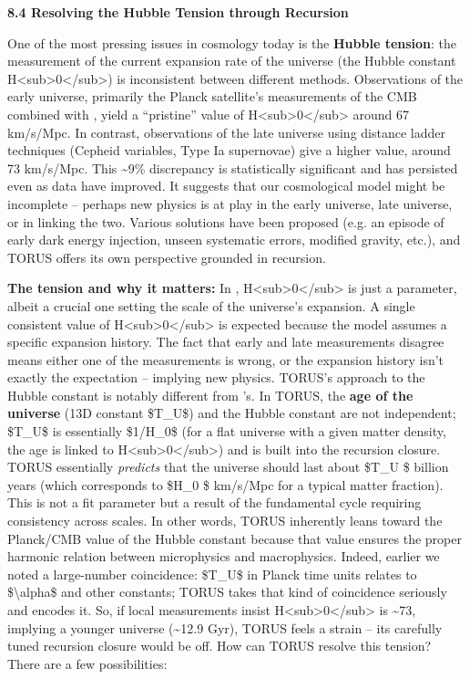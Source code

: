 \documentclass[
]{article}
\begin{document}
\textbf{8.4 Resolving the Hubble Tension through Recursion}

One of the most pressing issues in cosmology today is the \textbf{Hubble
tension}: the measurement of the current expansion rate of the universe
(the Hubble constant
H\textless sub\textgreater0\textless/sub\textgreater) is inconsistent
between different methods. Observations of the early universe, primarily
the Planck satellite's measurements of the CMB combined with \LambdaCDM, yield
a ``pristine'' value of
H\textless sub\textgreater0\textless/sub\textgreater{} around 67
km/s/Mpc. In contrast, observations of the late universe using distance
ladder techniques (Cepheid variables, Type Ia supernovae) give a higher
value, around 73 km/s/Mpc. This \textasciitilde9\% discrepancy is
statistically significant and has persisted even as data have improved.
It suggests that our cosmological model might be incomplete -- perhaps
new physics is at play in the early universe, late universe, or in
linking the two. Various solutions have been proposed (e.g. an episode
of early dark energy injection, unseen systematic errors, modified
gravity, etc.), and TORUS offers its own perspective grounded in
recursion.

\textbf{The tension and why it matters:} In \LambdaCDM,
H\textless sub\textgreater0\textless/sub\textgreater{} is just a
parameter, albeit a crucial one setting the scale of the universe's
expansion. A single consistent value of
H\textless sub\textgreater0\textless/sub\textgreater{} is expected
because the model assumes a specific expansion history. The fact that
early and late measurements disagree means either one of the
measurements is wrong, or the expansion history isn't exactly the \LambdaCDM
expectation -- implying new physics. TORUS's approach to the Hubble
constant is notably different from \LambdaCDM's. In TORUS, the \textbf{age of
the universe} (13D constant \$T\_U\$) and the Hubble constant are not
independent; \$T\_U\$ is essentially \$1/H\_0\$ (for a flat universe
with a given matter density, the age is linked to
H\textless sub\textgreater0\textless/sub\textgreater) and is built into
the recursion closure. TORUS essentially \emph{predicts} that the
universe should last about \$T\_U \$ billion years (which
corresponds to \$H\_0 \$ km/s/Mpc for a typical matter
fraction)\hspace{0pt}. This is not a fit parameter but a result of the
fundamental cycle requiring consistency across scales. In other words,
TORUS inherently leans toward the Planck/CMB value of the Hubble
constant because that value ensures the proper harmonic relation between
microphysics and macrophysics. Indeed, earlier we noted a large-number
coincidence: \$T\_U\$ in Planck time units relates to
\$\textbackslash alpha\$ and other constants; TORUS takes that kind of
coincidence seriously and encodes it. So, if local measurements insist
H\textless sub\textgreater0\textless/sub\textgreater{} is
\textasciitilde73, implying a younger universe (\textasciitilde12.9
Gyr), TORUS feels a strain -- its carefully tuned recursion closure
would be off\hspace{0pt}. How can TORUS resolve this tension? There are
a few possibilities:
\end{document}
